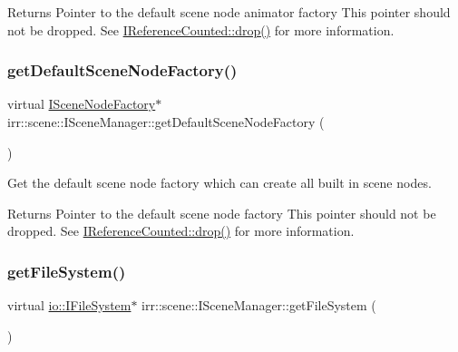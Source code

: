 \begin{DoxyReturn}{Returns}
Pointer to the default scene node animator factory This pointer should not be dropped. See \hyperlink{classirr_1_1IReferenceCounted_a03856a09355b89d178090c4a5f738543}{I\+Reference\+Counted\+::drop()} for more information. 
\end{DoxyReturn}
\mbox{\label{classirr_1_1scene_1_1ISceneManager_a1ea0ec7ec95a97819f1de5222b97e774}} 
\subsubsection{\texorpdfstring{get\+Default\+Scene\+Node\+Factory()}{getDefaultSceneNodeFactory()}}
{\footnotesize\ttfamily virtual \hyperlink{classirr_1_1scene_1_1ISceneNodeFactory}{I\+Scene\+Node\+Factory}$\ast$ irr\+::scene\+::\+I\+Scene\+Manager\+::get\+Default\+Scene\+Node\+Factory (\begin{DoxyParamCaption}{ }\end{DoxyParamCaption})\hspace{0.3cm}{\ttfamily [pure virtual]}}



Get the default scene node factory which can create all built in scene nodes. 

\begin{DoxyReturn}{Returns}
Pointer to the default scene node factory This pointer should not be dropped. See \hyperlink{classirr_1_1IReferenceCounted_a03856a09355b89d178090c4a5f738543}{I\+Reference\+Counted\+::drop()} for more information. 
\end{DoxyReturn}
\mbox{\label{classirr_1_1scene_1_1ISceneManager_adbd98fbeba199005cf795a5bae7ccbaf}} 
\subsubsection{\texorpdfstring{get\+File\+System()}{getFileSystem()}}
{\footnotesize\ttfamily virtual \hyperlink{classirr_1_1io_1_1IFileSystem}{io\+::\+I\+File\+System}$\ast$ irr\+::scene\+::\+I\+Scene\+Manager\+::get\+File\+System (\begin{DoxyParamCaption}{ }\end{DoxyParamCaption})\hspace{0.3cm}{\ttfamily [pure virtual]}}



